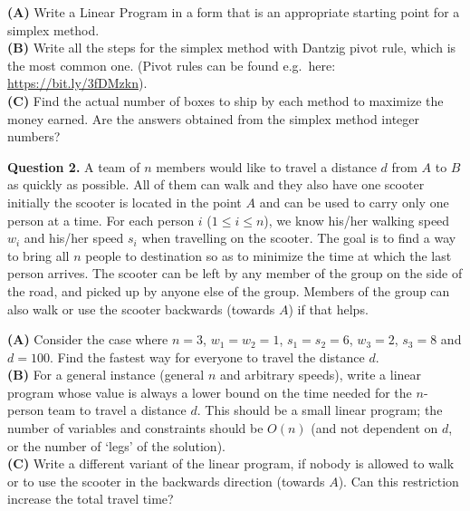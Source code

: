 \documentclass[jou]{apa6}
\begin{document}
\vspace{4pt}
{\bf (A)} Write a Linear Program in a form that is 
an appropriate starting point for a simplex method.\\
{\bf (B)} Write all the steps for the simplex method with Dantzig pivot rule, which is the most common one. (Pivot rules 
can be found e.g.\ here: \url{https://bit.ly/3fDMzkn}).\\
{\bf (C)} Find the actual number of boxes to ship by each method to maximize the money earned.
Are the answers obtained from the simplex  method integer numbers?



\vspace{10pt}
{\bf Question 2.} A team of $n$ members would like to travel a distance $d$ from $A$ to $B$
as quickly as possible. All of them can walk and they also have one scooter \textendash{} initially 
the scooter is located in the point $A$ and can be used to carry only one person at a time.  
For each person $i$ ($1 \leq i \leq n$), we
know his/her walking speed $w_i$ and his/her speed $s_i$ when travelling on the scooter.
The goal is to find a way to bring all $n$ people to destination so as to minimize the
time at which the last person arrives. The scooter can be left by any member of the
group on the side of the road, and picked up by anyone else of the group. Members
of the group can also walk or use the scooter backwards (towards $A$) if that helps.

\vspace{4pt}
{\bf (A)} Consider the case where $n = 3$, $w_1 = w_2 = 1$, $s_1 = s_2 = 6$, $w_3 = 2$, $s_3 = 8$ and
$d = 100$. Find the fastest way for everyone to travel the distance $d$.\\
{\bf (B)} For a general instance (general $n$ and arbitrary speeds), write a linear program
whose value is always a lower bound on the time needed for the $n$-person team
to travel a distance $d$. This should be a small linear program; the number
of variables and constraints should be $O(n)$ (and not dependent on $d$, or the
number of `legs' of the solution).\\
{\bf (C)} Write a different variant of the linear program, if nobody is allowed 
to walk or to use the scooter in the backwards direction (towards $A$). 
Can this restriction increase the total travel time?
\end{document}

